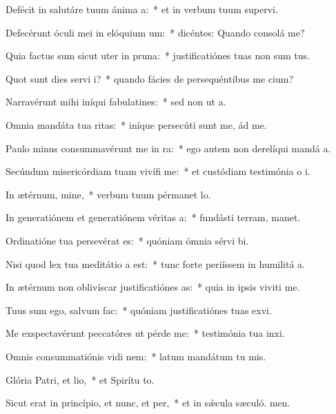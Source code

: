 \item Defécit in salutáre tuum ánima a:~* et in verbum tuum supervi.
\item Defecérunt óculi mei in elóquium um:~* dicéntes: Quando consolá me?
\item Quia factus sum sicut uter in pruna:~* justificatiónes tuas non sum tus.
\item Quot sunt dies servi i?~* quando fácies de persequéntibus me cium?
\item Narravérunt mihi iníqui fabulatines:~* sed non ut  a.
\item Omnia mandáta tua ritas:~* iníque persecúti sunt me, ád me.
\item Paulo minus consummavérunt me in ra:~* ego autem non derelíqui mandá a.
\item Secúndum misericórdiam tuam vivífi me:~* et custódiam testimónia o i.
\item In ætérnum, mine,~* verbum tuum pérmanet  lo.
\item In generatiónem et generatiónem véritas a:~* fundásti terram,  manet.
\item Ordinatióne tua persevérat es:~* quóniam ómnia sérvi bi.
\item Nisi quod lex tua meditátio a est:~* tunc forte periíssem in humilitá a.
\item In ætérnum non oblivíscar justificatiónes as:~* quia in ipsis viviti me.
\item Tuus sum ego, salvum  fac:~* quóniam justificatiónes tuas exvi.
\item Me exspectavérunt peccatóres ut pérde me:~* testimónia tua inxi.
\item Omnis consummatiónis vidi nem:~* latum mandátum tu mis.
\item Glória Patri, et lio,~* et Spirítu to.
\item Sicut erat in princípio, et nunc, et per,~* et in sǽcula sæculó. men.
